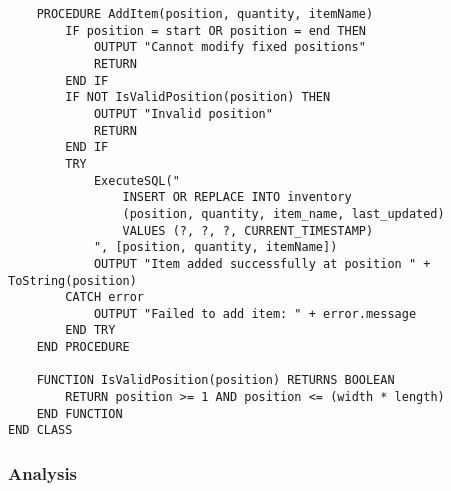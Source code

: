 \newpage
\begin{verbatim}
    PROCEDURE AddItem(position, quantity, itemName)
        IF position = start OR position = end THEN
            OUTPUT "Cannot modify fixed positions"
            RETURN
        END IF
        IF NOT IsValidPosition(position) THEN
            OUTPUT "Invalid position"
            RETURN
        END IF
        TRY
            ExecuteSQL("
                INSERT OR REPLACE INTO inventory
                (position, quantity, item_name, last_updated)
                VALUES (?, ?, ?, CURRENT_TIMESTAMP)
            ", [position, quantity, itemName])
            OUTPUT "Item added successfully at position " + ToString(position)
        CATCH error
            OUTPUT "Failed to add item: " + error.message
        END TRY
    END PROCEDURE
    
    FUNCTION IsValidPosition(position) RETURNS BOOLEAN
        RETURN position >= 1 AND position <= (width * length)
    END FUNCTION
END CLASS
\end{verbatim}

\subsubsection{Analysis}

